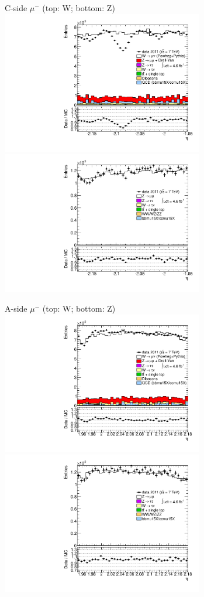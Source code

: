 {{
C-side $\mu^{-}$ (top: W; bottom: Z)
\centering
\includegraphics[width=0.66\textwidth]{dates/20130306/figures/etaphi/W_10_C_stack_l_eta_NEG} \\
\includegraphics[width=0.66\textwidth]{dates/20130306/figures/etaphi/Ztprobe_10_C_stack_lN_eta_ALL.pdf}

A-side $\mu^{-}$ (top: W; bottom: Z)
\centering
\includegraphics[width=0.66\textwidth]{dates/20130306/figures/etaphi/W_10_A_stack_l_eta_NEG} \\
\includegraphics[width=0.66\textwidth]{dates/20130306/figures/etaphi/Ztprobe_10_A_stack_lN_eta_ALL.pdf} 

}}
